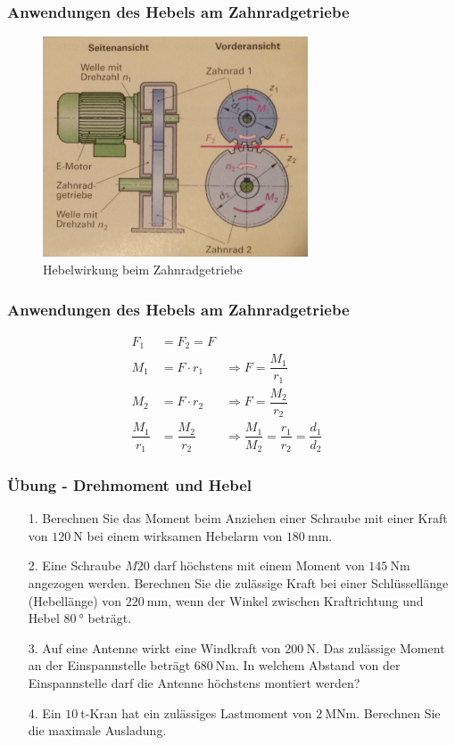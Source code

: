 \documentclass{beamer}
\begin{document}
\frame
{
\frametitle{Anwendungen des Hebels am Zahnradgetriebe}
	\begin{figure}
	  \includegraphics[width=0.7\textwidth]{Zahnradgetriebe.jpg}
	  \caption{Hebelwirkung beim Zahnradgetriebe}
	 \end{figure}
}
\frame
{
\frametitle{Anwendungen des Hebels am Zahnradgetriebe}
	  	\begin{align*}
	  		F_1&=F_2=F\\
	  		M_1&=F\cdot r_1 &\Rightarrow F=\dfrac{M_1}{r_1}\\
	  		M_2&=F\cdot r_2 &\Rightarrow F=\dfrac{M_2}{r_2}\\
	  		\dfrac{M_1}{r_1}&=\dfrac{M_2}{r_2} &\Rightarrow \dfrac{M_1}{M_2}=\dfrac{r_1}{r_2}=\dfrac{d_1}{d_2} &
	  	\end{align*}	    	  	  
}

\frame
{
\frametitle{Übung - \textbf{Drehmoment} und Hebel}
\begin{enumerate}
\item[1.] Berechnen Sie das Moment beim Anziehen einer Schraube mit einer Kraft von $\SI{120}{\newton}$ bei einem wirksamen Hebelarm von $\SI{180}{\milli\meter}$.
\item[2.] Eine Schraube $M20$ darf höchstens mit einem Moment von $\SI{145}{\newton\meter}$ angezogen werden. Berechnen Sie die zulässige Kraft bei einer Schlüssellänge (Hebellänge) von $\SI{220}{\milli\meter}$, wenn der Winkel zwischen Kraftrichtung und Hebel $\SI{80}{\degree}$ beträgt.
\item[3.] Auf eine Antenne wirkt eine Windkraft von $\SI{200}{\newton}$. Das zulässige Moment an der Einspannstelle beträgt $\SI{680}{\newton\meter}$. In welchem Abstand von der Einspannstelle darf die Antenne höchstens montiert werden?
\item[4.] Ein $\SI{10}{\tonne}$-Kran hat ein zulässiges Lastmoment von $\SI{2}{\mega\newton\meter}$. Berechnen Sie die maximale Ausladung.
\end{enumerate}
}
\end{document}
